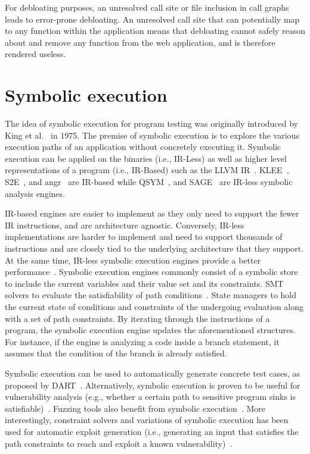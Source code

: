 For debloating purposes, an unresolved call site or file inclusion in call graphs leads to error-prone debloating. 
An unresolved call site that can potentially map to any function within the application means that debloating cannot safely reason about and remove any function from the web application, and is therefore rendered useless. 

\section{Symbolic execution}

The idea of symbolic execution for program testing was originally introduced by King et al.~\cite{king1976symbolic} in 1975. 
The premise of symbolic execution is to explore the various execution paths of an application without concretely executing it. 
Symbolic execution can be applied on the binaries (i.e., IR-Less) as well as higher level representations of a program (i.e., IR-Based) such as the LLVM IR~\cite{llvmir}. 
KLEE~\cite{cadar2008klee}, S2E~\cite{chipounov2009selective}, and angr~\cite{cheng2016binary} are IR-based while QSYM~\cite{yun2018qsym}, and SAGE~\cite{godefroid2012sage} are IR-less symbolic analysis engines. 

IR-based engines are easier to implement as they only need to support the fewer IR instructions, and are architecture agnostic. 
Conversely, IR-less implementations are harder to implement and need to support thousands of instructions and are closely tied to the underlying architecture that they support. 
At the same time, IR-less symbolic execution engines provide a better performance~\cite{poeplau2019systematic}.
Symbolic execution engines commonly consist of a symbolic store to include the current variables and their value set and its constraints. 
SMT solvers to evaluate the satisfiability of path conditions~\cite{moura2008z3}. 
State managers to hold the current state of conditions and constraints of the undergoing evaluation along with a set of path constraints. 
By iterating through the instructions of a program, the symbolic execution engine updates the aforementioned structures. 
For instance, if the engine is analyzing a code inside a branch statement, it assumes that the condition of the branch is already satisfied. 

Symbolic execution can be used to automatically generate concrete test cases, as proposed by DART~\cite{sen2009dart, sen2005cute}. 
Alternatively, symbolic execution is proven to be useful for vulnerability analysis (e.g., whether a certain path to sensitive program sinks is satisfiable)~\cite{5504701, wang2009intscope, cha2012unleashing, cadar2008klee}. 
Fuzzing tools also benefit from symbolic execution~\cite{godefroid2012sage}.
More interestingly, constraint solvers and variations of symbolic execution has been used for automatic exploit generation (i.e., generating an input that satisfies the path constraints to reach and exploit a known vulnerability)~\cite{alhuzali2018navex, avgerinos2014automatic}.

